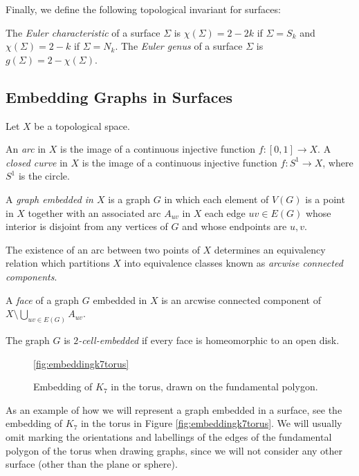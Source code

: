 Finally, we define the following topological invariant for surfaces:

\begin{definition}
The \emph{Euler characteristic} of a surface $\Sigma$ is $\chi(\Sigma) = 2 - 2k$ if $\Sigma = S_k$
and $\chi(\Sigma) = 2 - k$ if $\Sigma = N_k$. The \emph{Euler genus} of a surface $\Sigma$ is
$g(\Sigma) = 2 - \chi(\Sigma)$. 
\end{definition}

 

\subsection{Embedding Graphs in Surfaces}

Let $X$ be a topological space. 

\begin{definition}
An \emph{arc} in $X$ is the image of a continuous injective 
function $f : [0, 1] \rightarrow X$. A \emph{closed curve} in $X$ is the image
of a continuous injective function $f : S^1 \rightarrow X$, where $S^1$ is the circle.
\end{definition}

\begin{definition}
A \emph{graph embedded in $X$} is a graph $G$ in which each element
of $V(G)$ is a point in $X$ together with an associated arc $A_{uv}$ in $X$  each edge $uv \in E(G)$ whose 
interior is disjoint from any vertices of $G$ and whose endpoints are $u, v$. 
\end{definition}

The existence of an arc between two points of $X$ determines an equivalency relation which 
partitions $X$ into equivalence classes known as \emph{arcwise connected components}.

\begin{definition}
A \emph{face} of a graph $G$ embedded in $X$ is an arcwise connected component of
$X \setminus \bigcup_{uv \in E(G)} A_{uv}$. 

The graph $G$ is \emph{$2$-cell-embedded} if every face is homeomorphic to an open disk.
\end{definition}

\begin{figure}
\ref{fig:embeddingk7torus}
\centering
{}
\caption{Embedding of $K_7$ in the torus, drawn on the fundamental polygon.}
\end{figure}

As an example of how we will represent a graph embedded in a surface, see the embedding of $K_7$
in the torus in Figure \ref{fig:embeddingk7torus}. We will usually omit marking the orientations
and labellings of the edges of the fundamental polygon of the torus when drawing graphs, since
we will not consider any other surface (other than the plane or sphere). 

